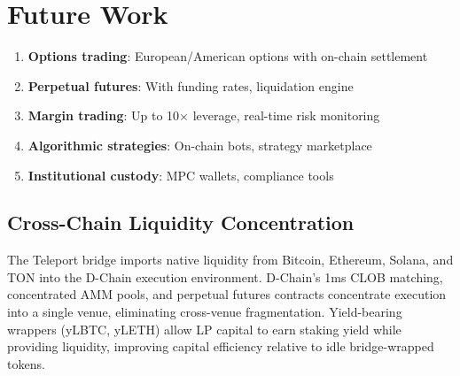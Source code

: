 \section{Future Work}


\begin{enumerate}
    \item \textbf{Options trading}: European/American options with on-chain settlement
    \item \textbf{Perpetual futures}: With funding rates, liquidation engine
    \item \textbf{Margin trading}: Up to 10$\times$ leverage, real-time risk monitoring
    \item \textbf{Algorithmic strategies}: On-chain bots, strategy marketplace
    \item \textbf{Institutional custody}: MPC wallets, compliance tools
\end{enumerate}

\subsection{Cross-Chain Liquidity Concentration}

The Teleport bridge imports native liquidity from Bitcoin, Ethereum, Solana, and TON into the D-Chain execution environment. D-Chain's 1ms CLOB matching, concentrated AMM pools, and perpetual futures contracts concentrate execution into a single venue, eliminating cross-venue fragmentation. Yield-bearing wrappers (yLBTC, yLETH) allow LP capital to earn staking yield while providing liquidity, improving capital efficiency relative to idle bridge-wrapped tokens.

